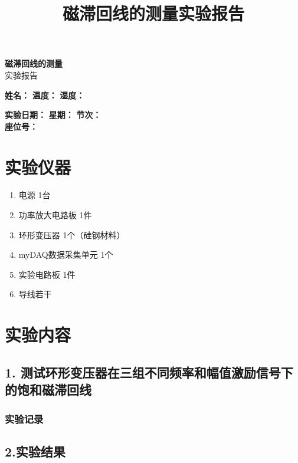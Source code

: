\documentclass[12pt,a4paper]{article}
\title{\textbf{磁滞回线的测量实验报告}}
\author{}
\date{}
\newcommand{\recordblank}[1]{\par\vspace*{#1}\par}
\begin{document}
\begin{center}
    {\LARGE\textbf{磁滞回线的测量}}\\[0.5cm]
    {\Large 实验报告}\\[1cm]
\end{center}

\begin{center}
    \textbf{姓名：}\underline{\makebox[4cm][c]{}} \quad
    \textbf{温度：}\underline{\makebox[2.2cm][c]{}} \quad
    \textbf{湿度：}\underline{\makebox[2cm][c]{}}
\end{center}

\begin{center}
    \textbf{实验日期：}\underline{\makebox[3.5cm][c]{}} \quad
    \textbf{星期：}\underline{\makebox[2cm][c]{}} \quad
    \textbf{节次：}\underline{\makebox[3.5cm][c]{}} \\[0.3cm]
    \textbf{座位号：}\underline{\makebox[3cm][c]{}}
\end{center}

\section*{实验仪器}
\begin{enumerate}
    \item 电源 1台
    \item 功率放大电路板 1件
    \item 环形变压器 1个（硅钢材料）
    \item myDAQ数据采集单元 1个
    \item 实验电路板 1件
    \item 导线若干
\end{enumerate}

\section*{实验内容}

\subsection*{1. 测试环形变压器在三组不同频率和幅值激励信号下的饱和磁滞回线}

\subsubsection*{实验记录}
\recordblank{5.9cm}
\subsection*{2.实验结果}
\recordblank{18cm}
\clearpage
\recordblank{8.4cm}
\end{document}

